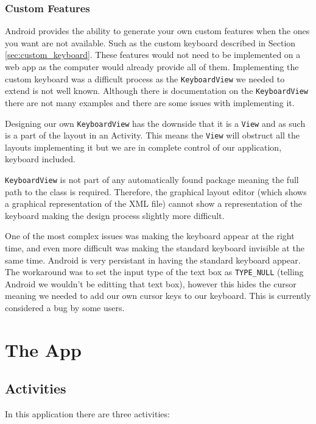 \documentclass{report}
\begin{document}
\subsection{Custom Features}
\label{sub:custom_features}

Android provides the ability to generate your own custom features when the ones you want are not available. Such as the custom keyboard described in Section \ref{sec:custom_keyboard}. These features would not need to be implemented on a web app as the computer would already provide all of them. Implementing the custom keyboard was a difficult process as the {\tt KeyboardView} we needed to extend is not well known. Although there is documentation on the {\tt KeyboardView} there are not many examples and there are some issues with implementing it.

Designing our own {\tt KeyboardView} has the downside that it is a {\tt View} and as such is a part of the layout in an Activity. This means the {\tt View} will obstruct all the layouts implementing it but we are in complete control of our application, keyboard included.

{\tt KeyboardView} is not part of any automatically found package meaning the full path to the class is required. Therefore, the graphical layout editor (which shows a graphical representation of the XML file) cannot show a representation of the keyboard making the design process slightly more difficult.

One of the most complex issues was making the keyboard appear at the right time, and even more difficult was making the standard keyboard invisible at the same time. Android is very persistant in having the standard keyboard appear. The workaround was to set the input type of the text box as {\tt TYPE\_NULL} (telling Android we wouldn't be editting that text box), however this hides the cursor meaning we needed to add our own cursor keys to our keyboard. This is currently considered a bug by some users\cite{keyboardview}.

\chapter{The App}
\label{chap:the_app}

\section{Activities}

In this application there are three activities: 
\end{document}
